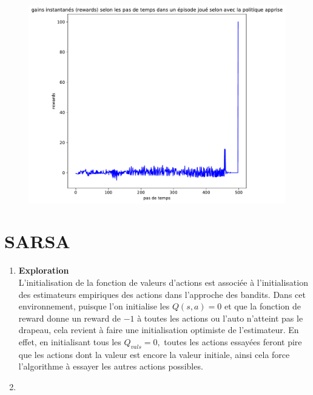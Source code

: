 \documentclass[letterpaper,11pt]{article}
\begin{document}
\begin{enumerate}[label=(\alph*)]
\begin{figure}[H]
\begin{center}
\caption{}
\includegraphics[scale=0.5]{gain_par_pas.pdf}
\end{center}
\end{figure}

\end{enumerate}

\section{SARSA}

\begin{enumerate}[label=(\alph*)]

\item \textbf{Exploration}\\
L'initialisation de la fonction de valeurs d'actions est associée à l'initialisation des estimateurs empiriques des actions dans l'approche des bandits. Dans cet environnement, puisque l'on initialise les $Q(s,a)=0$ et que la fonction de reward donne un reward de $-1$ à toutes les actions ou l'auto n'atteint pas le drapeau, cela revient à faire une initialisation optimiste de l'estimateur. En effet, en initialisant tous les $Q_{vals}=0,$ toutes les actions essayées feront pire que les actions dont la valeur est encore la valeur initiale, ainsi cela force l'algorithme à essayer les autres actions possibles.

\item

\end{enumerate}
\end{document}
